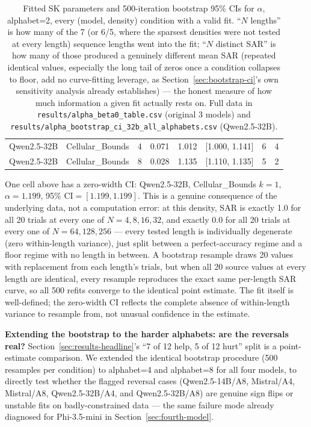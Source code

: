 \documentclass[11pt]{article}
\begin{document}
\begin{table}[htbp]
\begin{tabular}{llrrrrrr}
Qwen2.5-32B & Cellular\_Bounds & 4 & 0.071 & 1.012 & [1.000, 1.141] & 6 & 4 \\
Qwen2.5-32B & Cellular\_Bounds & 8 & 0.028 & 1.135 & [1.110, 1.135] & 5 & 2 \\
\bottomrule
\end{tabular}
\caption{Fitted SK parameters and 500-iteration bootstrap 95\% CIs for $\alpha$, alphabet=2, every (model, density) condition with a valid fit. ``$N$ lengths'' is how many of the 7 (or 6/5, where the sparsest densities were not tested at every length) sequence lengths went into the fit; ``$N$ distinct SAR'' is how many of those produced a genuinely different mean SAR (repeated identical values, especially the long tail of zeros once a condition collapses to floor, add no curve-fitting leverage, as Section~\ref{sec:bootstrap-ci}'s own sensitivity analysis already establishes) --- the honest measure of how much information a given fit actually rests on. Full data in \texttt{results/alpha\_beta0\_table.csv} (original 3 models) and \texttt{results/alpha\_bootstrap\_ci\_32b\_all\_alphabets.csv} (Qwen2.5-32B).}
\label{tab:alpha-beta0}
\end{table}

One cell above has a zero-width CI: Qwen2.5-32B, Cellular\_Bounds $k=1$, $\alpha=1.199$, 95\% CI$=[1.199, 1.199]$. This is a genuine consequence of the underlying data, not a computation error: at this density, SAR is exactly 1.0 for all 20 trials at every one of $N=4, 8, 16, 32$, and exactly 0.0 for all 20 trials at every one of $N=64, 128, 256$ --- every tested length is individually degenerate (zero within-length variance), just split between a perfect-accuracy regime and a floor regime with no length in between. A bootstrap resample draws 20 values with replacement from each length's trials, but when all 20 source values at every length are identical, every resample reproduces the exact same per-length SAR curve, so all 500 refits converge to the identical point estimate. The fit itself is well-defined; the zero-width CI reflects the complete absence of within-length variance to resample from, not unusual confidence in the estimate.

\textbf{Extending the bootstrap to the harder alphabets: are the reversals real?} Section~\ref{sec:results-headline}'s ``7 of 12 help, 5 of 12 hurt'' split is a point-estimate comparison. We extended the identical bootstrap procedure (500 resamples per condition) to alphabet=4 and alphabet=8 for all four models, to directly test whether the flagged reversal cases (Qwen2.5-14B/A8, Mistral/A4, Mistral/A8, Qwen2.5-32B/A4, and Qwen2.5-32B/A8) are genuine sign flips or unstable fits on badly-constrained data --- the same failure mode already diagnosed for Phi-3.5-mini in Section~\ref{sec:fourth-model}.
\end{document}
